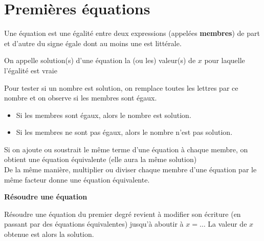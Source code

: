 \section{Premières équations}

{Une équation est une égalité entre deux expressions (appelées \textbf{membres}) de part et d'autre du signe égale dont au moins une est littérale.}



{On appelle solution(s) d'une équation la (ou les) valeur(s) de $x$ pour laquelle l'égalité est vraie}


{Pour tester si un nombre est solution, on remplace toutes les lettres par ce nombre  et on observe si les membres sont égaux. 
\begin{itemize}
    \item Si les membres sont égaux, alors le nombre est solution.
    \item Si les membres ne sont pas égaux, alors le nombre n'est pas solution.
\end{itemize}}


{Si on ajoute ou soustrait le même terme d'une équation à chaque membre, on obtient une équation équivalente (elle aura la même solution)\\
De la même manière, multiplier ou diviser chaque membre d'une équation par le même facteur donne une équation équivalente.
}

\textbf{Résoudre une équation}

Résoudre une équation du premier degré revient à modifier son écriture (en passant par des équations équivalentes) jusqu'à aboutir à $x=\dots$
La valeur de $x$ obtenue est alors la solution.

